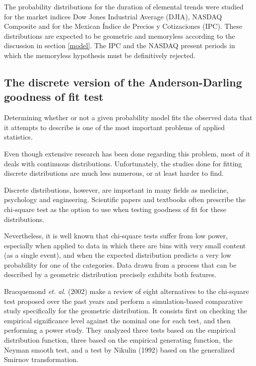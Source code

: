 \documentclass[a4paper]{jpconf}
\begin{document}
The probability distributions for the duration of elemental trends were studied for the market indices Dow Jones Industrial Average (DJIA), NASDAQ Composite and for the Mexican \'Indice de Precios y Cotizaciones (IPC). These distributions are expected to be geometric and memoryless according to the discussion in section \ref{model}. The IPC and the NASDAQ present periods in which the memoryless hypothesis must be definitively rejected.

\begin{appendices}
   \addappheadtotoc
   \appendixpage
  
\section*{The discrete version of the Anderson-Darling goodness of fit test}
\label{apendice}

Determining whether or not a given probability model fits the observed
 data that it attempts to describe is one of the most important problems of applied statistics.

Even though extensive research has been done regarding this problem, most of it deals with
 continuous distributions. Unfortunately, the studies done for fitting discrete distributions
 are much less numerous, or at least harder to find.

Discrete distributions, however, are important in many fields as medicine, psychology and
 engineering. Scientific papers and textbooks
 often prescribe the chi-square test as the option to use when testing goodness of fit 
 for these distributions.
 
Nevertheless, it is well known that chi-square tests suffer from low power, especially when
 applied to data in which there are bins with very small content (as a single event),
 and when the expected distribution predicts a very low probability for one of the categories.
 Data drawn from a process that can be described by a geometric distribution precisely
 exhibits both features.

 Bracquemond {\it et. al.} (2002) \cite{BraCreGau} make a review of eight alternatives to the chi-square test
 proposed over the past years and perform a simulation-based
 comparative
 study specifically for the geometric distribution. It consists first on checking the
 empirical significance level against the nominal one for each test, and then performing
 a power study. They analyzed three tests based on the empirical distribution function,
 three based on the empirical generating function, the Neyman smooth test, 
 and a test by Nikulin (1992) \cite{Nikulin} based on the generalized Smirnov transformation.
 

\end{appendices}
\end{document}
